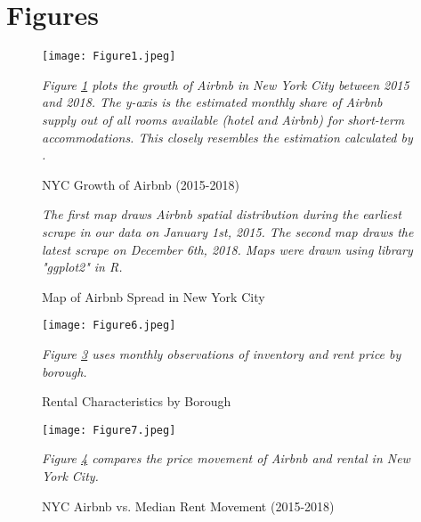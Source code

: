 \documentclass[12pt]{article}
\begin{document}
	\section*{Figures} %

		\begin{figure}[!htb] %
			\begin{center}
				\caption{NYC Growth of Airbnb (2015-2018)}
				\label{fig:AirbnbGrowth}
				\texttt{[image: Figure1.jpeg]}
			\end{center}
			\vspace{-.2in}
			\emph{Figure \ref{fig:AirbnbGrowth} plots the growth of Airbnb in New York City between 2015 and 2018. The y-axis is the estimated monthly share of Airbnb supply out of all rooms available (hotel and Airbnb) for short-term accommodations. This closely resembles the estimation calculated by \citet{farronato2018welfare}.} 
		\end{figure}
		
	
		\begin{figure}[!htb]%
    			\begin{center}
				\caption{Map of Airbnb Spread in New York City}%
				\label{fig:AirbnbSpread}
    				\qquad
   			 \end{center}
			 \emph{The first map draws Airbnb spatial distribution during the earliest scrape in our data on January 1st, 2015. The second map draws the latest scrape on December 6th, 2018. Maps were drawn using library "ggplot2" in R.}
		\end{figure}
		
		
		\begin{figure}[!htb] %
			\begin{center}
				\caption{Rental Characteristics by Borough}
				\label{fig:RentalBorough}
				\texttt{[image: Figure6.jpeg]}
			\end{center}
			\vspace{-.2in}
			\emph{Figure \ref{fig:RentalBorough} uses monthly observations of inventory and rent price by borough.}
		\end{figure}
		
		\begin{figure}[!htb] %
			\begin{center}
				\caption{NYC Airbnb vs. Median Rent Movement (2015-2018)}
				\label{fig:AirbnbvsMedianRent}
				\texttt{[image: Figure7.jpeg]}
			\end{center}
			\vspace{-.2in}
			\emph{Figure \ref{fig:AirbnbvsMedianRent} compares the price movement of Airbnb and rental in New York City.}
		\end{figure}
		
\end{document}
